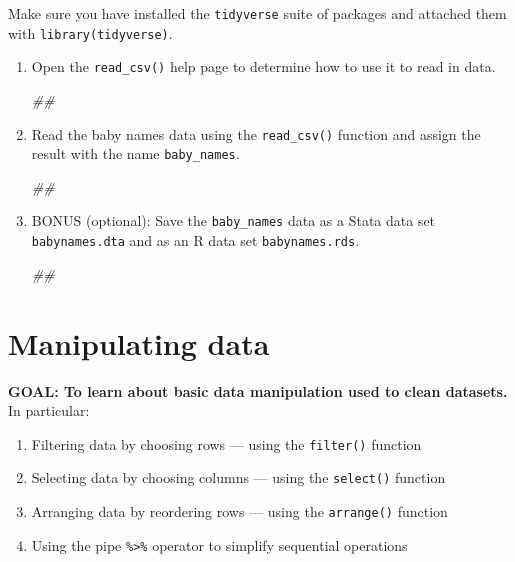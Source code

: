 \documentclass[
]{book}
\newenvironment{Shaded}{\begin{snugshade}}{\end{snugshade}}
\newcommand{\CommentTok}[1]{\textcolor[rgb]{0.56,0.35,0.01}{\textit{#1}}}
\providecommand{\tightlist}{%
  \setlength{\itemsep}{0pt}\setlength{\parskip}{0pt}}
\begin{document}
Make sure you have installed the \texttt{tidyverse} suite of packages and attached them with \texttt{library(tidyverse)}.

\begin{enumerate}
\def\labelenumi{\arabic{enumi}.}
\item
  Open the \texttt{read\_csv()} help page to determine how to use it to read in data.

\begin{Shaded}
\begin{Highlighting}[]
\CommentTok{##}
\end{Highlighting}
\end{Shaded}
\item
  Read the baby names data using the \texttt{read\_csv()} function and assign the result
  with the name \texttt{baby\_names}.

\begin{Shaded}
\begin{Highlighting}[]
\CommentTok{##}
\end{Highlighting}
\end{Shaded}
\item
  BONUS (optional): Save the \texttt{baby\_names} data as a Stata data set \texttt{babynames.dta}
  and as an R data set \texttt{babynames.rds}.

\begin{Shaded}
\begin{Highlighting}[]
\CommentTok{##}
\end{Highlighting}
\end{Shaded}
\end{enumerate}

\hypertarget{manipulating-data}{%
\section{Manipulating data}\label{manipulating-data}}

\textbf{GOAL: To learn about basic data manipulation used to clean datasets.} In particular:

\begin{enumerate}
\def\labelenumi{\arabic{enumi}.}
\tightlist
\item
  Filtering data by choosing rows --- using the \texttt{filter()} function
\item
  Selecting data by choosing columns --- using the \texttt{select()} function
\item
  Arranging data by reordering rows --- using the \texttt{arrange()} function
\item
  Using the pipe \texttt{\%\textgreater{}\%} operator to simplify sequential operations
\end{enumerate}
\end{document}
